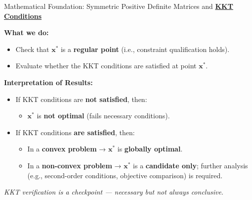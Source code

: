 \documentclass{beamer}
\begin{document}
\begin{frame}{{Mathematical Foundation: Symmetric Positive Definite Matrices and \textbf{\underline{KKT Conditions}}}}


    \medskip

    \textbf{What we do:}
    \begin{itemize}
        \item Check that \(\mathbf{x^*}\) is a \textbf{regular point} (i.e., constraint qualification holds).
        \item Evaluate whether the KKT conditions are satisfied at point \(\mathbf{x^*}\).
    \end{itemize}
    
    \textbf{Interpretation of Results:}
    \begin{itemize}
        \item If KKT conditions are \textbf{not satisfied}, then:
        \begin{itemize}
            \item \(\mathbf{x^*}\) is \textbf{not optimal} (fails necessary conditions).
        \end{itemize}
        \item If KKT conditions \textbf{are satisfied}, then:
        \begin{itemize}
            \item In a \textbf{convex problem} → \(\mathbf{x^*}\) is \textbf{globally optimal}.
            \item In a \textbf{non-convex problem} → \(\mathbf{x^*}\) is a \textbf{candidate only}; further analysis (e.g., second-order conditions, objective comparison) is required.
        \end{itemize}
    \end{itemize}

    \textit{KKT verification is a checkpoint — necessary but not always conclusive.}
    
\end{frame}
\end{document}
